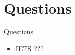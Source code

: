 \section{Questions}

\begin{frame}{Questions}
    \begin{itemize}
        \item IETS ???
    \end{itemize}
\end{frame}

